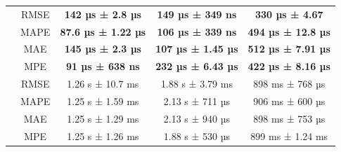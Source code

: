 \begin{table}[!htp]
\begin{tabular}{|c|c|ccc|}
        \cellcolor[HTML]{C0C0C0}                          & RMSE                                              & \multicolumn{1}{c|}{\textbf{142 µs ± 2.8 µs}}                           & \multicolumn{1}{c|}{\textbf{149 µs ± 349 ns}}                          & \textbf{330 µs ± 4.67}    \\ \cline{2-5}
        \rowcolor[HTML]{EFEFEF}
        \cellcolor[HTML]{C0C0C0}                          & MAPE                                              & \multicolumn{1}{c|}{\cellcolor[HTML]{EFEFEF}\textbf{87.6 µs ± 1.22 µs}} & \multicolumn{1}{c|}{\cellcolor[HTML]{EFEFEF}\textbf{106 µs ± 339 ns}}  & \textbf{494 µs ± 12.8 µs} \\ \cline{2-5}
        \cellcolor[HTML]{C0C0C0}                          & MAE                                               & \multicolumn{1}{c|}{\textbf{145 µs ± 2.3 µs}}                           & \multicolumn{1}{c|}{\textbf{107 µs ± 1.45 µs}}                         & \textbf{512 µs ± 7.91 µs} \\ \cline{2-5}
        \rowcolor[HTML]{EFEFEF}
        \multirow{-4}{*}{\cellcolor[HTML]{C0C0C0}ReW}     & MPE                                               & \multicolumn{1}{c|}{\cellcolor[HTML]{EFEFEF}\textbf{91 µs ± 638 ns}}    & \multicolumn{1}{c|}{\cellcolor[HTML]{EFEFEF}\textbf{232 µs ± 6.43 µs}} & \textbf{422 µs ± 8.16 µs} \\ \hline
        \cellcolor[HTML]{C0C0C0}                          & RMSE                                              & \multicolumn{1}{c|}{1.26 s ± 10.7 ms}                                   & \multicolumn{1}{c|}{1.88 s ± 3.79 ms}                                  & 898 ms ± 768 µs           \\ \cline{2-5}
        \rowcolor[HTML]{EFEFEF}
        \cellcolor[HTML]{C0C0C0}                          & MAPE                                              & \multicolumn{1}{c|}{\cellcolor[HTML]{EFEFEF}1.25 s ± 1.59 ms}           & \multicolumn{1}{c|}{\cellcolor[HTML]{EFEFEF}2.13 s ± 711 µs}           & 906 ms ± 600 µs           \\ \cline{2-5}
        \cellcolor[HTML]{C0C0C0}                          & MAE                                               & \multicolumn{1}{c|}{1.25 s ± 1.29 ms}                                   & \multicolumn{1}{c|}{2.13 s ± 940 µs}                                   & 898 ms ± 753 µs           \\ \cline{2-5}
        \rowcolor[HTML]{EFEFEF}
        \multirow{-4}{*}{\cellcolor[HTML]{C0C0C0}Prophet} & MPE                                               & \multicolumn{1}{c|}{\cellcolor[HTML]{EFEFEF}1.25 s ± 1.26 ms}           & \multicolumn{1}{c|}{\cellcolor[HTML]{EFEFEF}1.88 s ± 530 µs}           & 899 ms ± 1.24 ms          \\ \hline
    \end{tabular}
\end{table}

